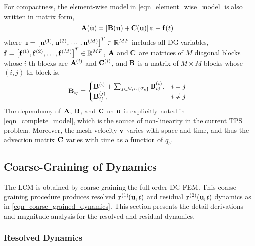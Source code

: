 For compactness, the element-wise model in \cref{eqn_element_wise_model} is also written in matrix form,
\begin{equation}
    \mathbf{A}(\dot{\mathbf{u}}) = \left[\mathbf{B}(\mathbf{u}) + \mathbf{C}(\mathbf{u})\right]\mathbf{u} + \mathbf{f}(t)\label{eqn_complete_model}
\end{equation}
where $\mathbf{u} = \left[\mathbf{u}^{(1)},\mathbf{u}^{(2)},\cdots,\mathbf{u}^{(M)}\right]^T\in\mathbb{R}^{MP}$ includes all DG variables, $\mathbf{f}=\left[\mathbf{f}^{(1)},\mathbf{f}^{(2)},\dots,\mathbf{f}^{(M)}\right]^T\in\mathbb{R}^{MP}$, $\mathbf{A}$ and $\mathbf{C}$ are matrices of $M$ diagonal blocks whose $i$-th blocks are $\mathbf{A}^{(i)}$ and $\mathbf{C}^{(i)}$, and $\mathbf{B}$ is a matrix of $M\times M$ blocks whose $(i,j)$-th block is,
\begin{equation}
    \mathbf{B}_{ij} = \begin{cases}
            \mathbf{B}^{(i)} + \sum_{j\in\mathcal{N}_i\cup\left\{T_b\right\}}\mathbf{B}^{(i)}_{ij}, & i=j\\
            \mathbf{B}^{(j)}_{ij}, & i\neq j
        \end{cases}
\end{equation}
The dependency of $\mathbf{A}$, $\mathbf{B}$, and $\mathbf{C}$ on $\mathbf{u}$ is explicitly noted in \cref{eqn_complete_model}, which is the source of non-linearity in the current TPS problem. Moreover, the mesh velocity $\mathbf{v}$ varies with space and time, and thus the advection matrix $\mathbf{C}$ varies with time as a function of $q_b$.

\subsection{Coarse-Graining of Dynamics}

The LCM is obtained by coarse-graining the full-order DG-FEM. This coarse-graining procedure produces resolved $\mathbf{r}^{(1)}(\mathbf{u},t)$ and residual $\mathbf{r}^{(2)}(\mathbf{u},t)$ dynamics as in \cref{eqn_coarse_grained_dynamics}. This section presents the detail derivations and magnitude analysis for the resolved and residual dynamics.

\subsubsection{Resolved Dynamics}


